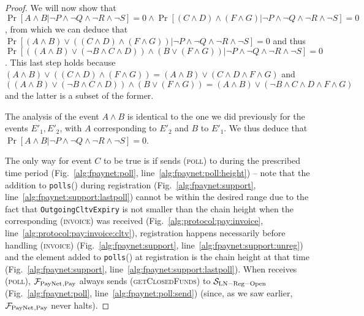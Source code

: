 \begin{proof}
  We will now show that $\Pr[A \wedge B | \neg P \wedge \neg Q \wedge \neg R
  \wedge \neg S] = 0 \wedge \Pr[(C \wedge D) \wedge (F \wedge G) | \neg P \wedge
  \neg Q \wedge \neg R \wedge \neg S] = 0$, from which we can deduce that
  $\Pr[(A \wedge B) \vee ((C \wedge D) \wedge (F \wedge G)) | \neg P \wedge \neg
  Q \wedge \neg R \wedge \neg S] = 0$ and thus $\Pr[((A \wedge B) \vee (\neg B
  \wedge C \wedge D)) \wedge (B \vee (F \wedge G)) | \neg P \wedge \neg Q \wedge
  \neg R \wedge \neg S] = 0$. This last step holds because $(A \wedge B) \vee
  ((C \wedge D) \wedge (F \wedge G)) = (A \wedge B) \vee (C \wedge D \wedge F
  \wedge G)$ and $((A \wedge B) \vee (\neg B \wedge C \wedge D)) \wedge (B \vee
  (F \wedge G)) = (A \wedge B) \vee (\neg B \wedge C \wedge D \wedge F \wedge
  G)$ and the latter is a subset of the former.

  The analysis of the event $A \wedge B$ is identical to the one we did
  previously for the events $E'_1, E'_2$, with $A$ corresponding to $E'_2$ and
  $B$ to $E'_1$. We thus deduce that $\Pr[A \wedge B | \neg P \wedge \neg Q
  \wedge \neg R \wedge \neg S] = 0$.

  The only way for event $C$ to be true is if \environment{} sends
  (\textsc{poll}) to \dave{} during the prescribed time period
  (Fig.~\ref{alg:fpaynet:poll}, line~\ref{alg:fpaynet:poll:height}) -- note that
  the addition to \texttt{polls}(\dave) during registration
  (Fig.~\ref{alg:fpaynet:support}, line~\ref{alg:fpaynet:support:lastpoll})
  cannot be within the desired range due to the fact that
  \texttt{OutgoingCltvExpiry} is not smaller than the chain height when the
  corresponding (\textsc{invoice}) was received
  (Fig.~\ref{alg:protocol:pay:invoice},
  line~\ref{alg:protocol:pay:invoice:cltv}), registration happens necessarily
  before handling (\textsc{invoice}) (Fig.~\ref{alg:fpaynet:support},
  line~\ref{alg:fpaynet:support:unreg}) and the element added to
  \texttt{polls}(\dave) at registration is the chain height at that time
  (Fig.~\ref{alg:fpaynet:support}, line~\ref{alg:fpaynet:support:lastpoll}).
  When \dave{} receives (\textsc{poll}), $\mathcal{F}_{\mathrm{PayNet}}{}_{\mathrm{, Pay}}$ always
  sends (\textsc{getClosedFunds}) to $\mathcal{S}_{\mathrm{LN - Reg - Open}}$
  (Fig.~\ref{alg:fpaynet:poll}, line~\ref{alg:fpaynet:poll:send}) (since, as we
  saw earlier, $\mathcal{F}_{\mathrm{PayNet}}{}_{\mathrm{, Pay}}$ never halts).


\end{proof}
